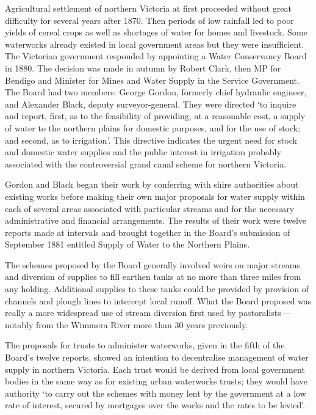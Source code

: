 Agricultural settlement of northern Victoria at first proceeded
without great difficulty for several years after 1870.  Then periods
of low rainfall led to poor yields of cereal crops as well as
shortages of water for homes and livestock.  Some waterworks already
existed in local government areas but they were insufficient.  The
Victorian government responded by appointing a Water Conservancy Board
in 1880.  The decision was made in autumn by Robert Clark,
 then MP for
Bendigo and Minister for Mines and Water Supply in the Service
Government.  The Board had two members: George Gordon,  formerly chief hydraulic engineer, and Alexander Black,
 deputy
surveyor-general.  They were directed `to inquire and report, first,
as to the feasibility of providing, at a reasonable cost, a supply of
water to the northern plains for domestic purposes, and for the use of
stock; and second, as to irrigation'. This directive indicates the
urgent need for stock and domestic water supplies and the public
interest in irrigation probably associated with the controversial
grand canal scheme  for northern
Victoria.

Gordon and Black began their work by conferring with shire authorities
about existing works before making their own major proposals for water
supply within each of several areas associated with particular streams
and for the necessary administrative and financial arrangements.  The
results of their work were twelve reports made at intervals and
brought together in the Board's submission of September 1881 entitled
Supply of Water to the Northern Plains.

The schemes proposed by the Board generally involved weirs on major
streams and diversion of supplies to fill earthen tanks at no more
than three miles from any holding. Additional supplies to these tanks
could be provided by provision of channels and plough lines to
intercept local runoff.  What the Board proposed was really a more
wide\-spread use of stream diversion first used by
pastoralists\,---\,notably from the Wimmera River
 more than 30 years
previously.

The proposals for trusts  to
administer waterworks, given in the fifth of the Board's twelve
reports, showed an intention to decentralise management of water
supply in northern Victoria.  Each trust would be derived from local
government bodies in the same way as for existing urban waterworks
trusts; they would have authority `to carry out the schemes with money
lent by the government at a low rate of interest, secured by mortgages
over the works and the rates to be levied'.

